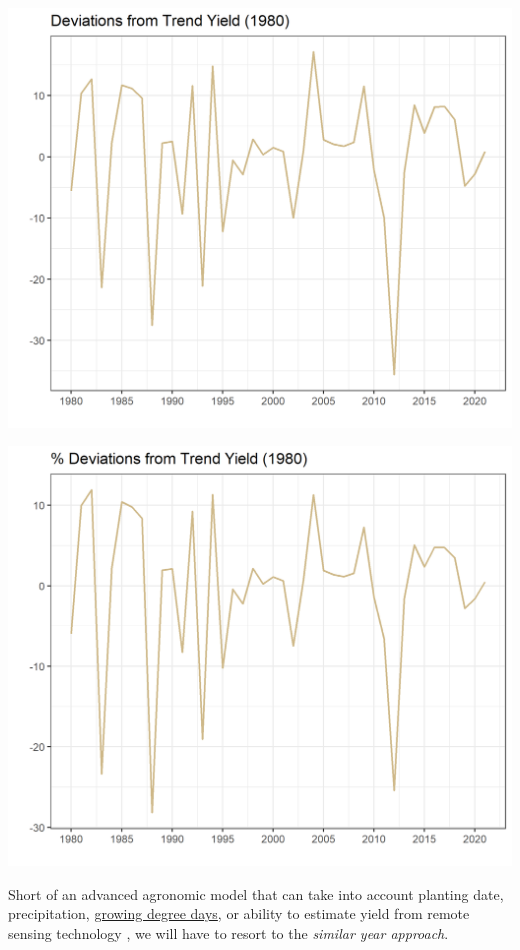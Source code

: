 \documentclass[
]{book}
\begin{document}
\includegraphics{assets/ForecastProduction-LevelDeviation.png}

\includegraphics{assets/ForecastProduction-PercDeviation.png}

Short of an advanced agronomic model that can take into account planting date, precipitation, \href{https://en.wikipedia.org/wiki/Growing_degree-day}{growing degree days}, or ability to estimate yield from remote sensing technology \citep{unganai_drought_1998}, we will have to resort to the \emph{similar year approach}.
\end{document}

